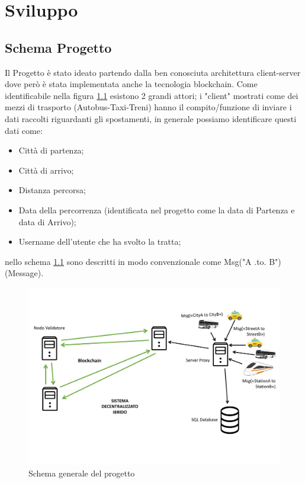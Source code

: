 \documentclass[11pt,a4paper,titlepage,twoside,openright]{report}
\begin{document}
\chapter{Sviluppo}
\section{Schema Progetto}\label{Schema-Progetto}
Il Progetto è stato ideato partendo dalla ben conosciuta architettura client-server dove però è stata implementata anche la tecnologia blockchain. Come identificabile nella figura \ref{fig:sch} esistono 2 grandi attori; i "client" mostrati come dei mezzi di trasporto (Autobus-Taxi-Treni) hanno il compito/funzione di inviare i dati raccolti riguardanti gli spostamenti, in generale possiamo identificare questi dati come: 
\begin{itemize}
\item Città di partenza;
\item Città di arrivo;
\item Distanza percorsa;
\item Data della percorrenza (identificata nel progetto come la data di Partenza e data di Arrivo);
\item Username dell'utente che ha svolto la tratta;
\end{itemize}
nello schema \ref{fig:sch} sono descritti in modo convenzionale come Msg("A .to. B") (Message).
\begin{figure}[h]
	\includegraphics[width=\textwidth]{Schema_Progetto}
	\centering
	\caption{Schema generale del progetto}
	\label{fig:sch}
\end{figure}
\end{document}

